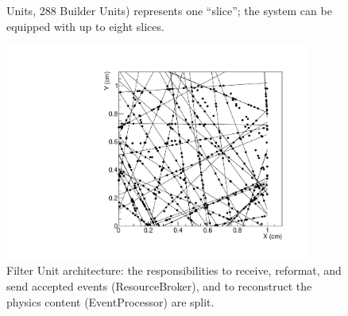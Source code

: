 \documentclass{JINST}
\begin{document}
\begin{figure}[!Hhtb]
\begin{minipage}[t]{4.0cm}
\begin{center}
{Units, 288  Builder Units) represents one “slice”; the  system can be equipped
with up to eight slices. \label{fig:hltarc}}
	\end{center}
\end{minipage}
\begin{minipage}[t]{4.0cm}
\begin{center}
	\includegraphics[width=0.9\textwidth]{figs/50events_hits_tracks.pdf}
	\caption{Filter Unit architecture: the responsibilities to receive, reformat, and
send accepted events (ResourceBroker), and to reconstruct the physics content
(EventProcessor) are split.  \label{fig:fu}}
	\end{center}
\end{minipage}
\end{figure}
\end{document}

